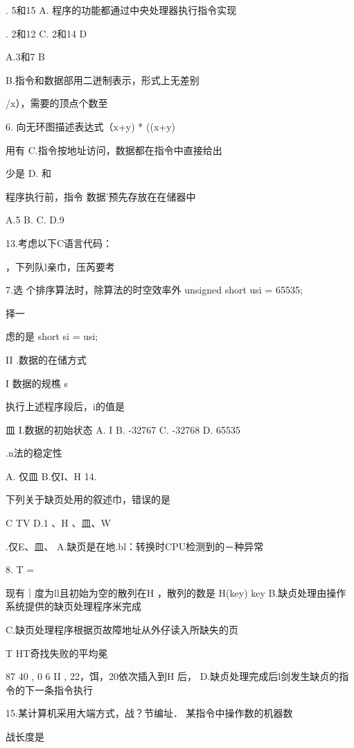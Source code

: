 {    . 5和15    A. 程序的功能都通过中央处理器执行指令实现

    . 2和12    C. 2和14    D

  A.3和7    B

    B.指令和数据部用二迸制表示，形式上无差别

    /x），需要的顶点个数至

6.    向无环图描述表达式（x+y) * ((x+y)

   用有    C.指令按地址访问，数据都在指令中直接给出

  少是    D.    和

    程序执行前，指令   数据'预先存放在在储器中

   A.5    B.      C.      D.9

    13.考虑以下C语言代码：

    ，下列队l亲巾，压芮要考

7.选   个排序算法时，除算法的时空效率外    unsigned short usi = 65535;

    择一

  虑的是    short si = usi;

    II .数据的在储方式

   I 数据的规樵    s

    执行上述程序段后，i的值是

   皿    I.数据的初始状态    A. I     B. -32767    C. -32768    D. 65535

    .n法的稳定性

   A. 仅皿    B.仅I、H    14.

    下列关于缺页处用的叙述巾，错误的是

  C    TV    D.1 、H 、皿、W

    .仅E、皿、    A.缺页是在地.bl：转换时CPU检测到的－种异常

8.    T    =

   现有｜度为ll且初始为空的散列在H ，散列的数是 H(key)  key    B.缺贞处理由操作系统提供的缺页处理程序米完成


    C.缺页处理程序根据页故障地址从外仔读入所缺失的页

    T    HT奇找失败的平均冕

   87  40 , 0  6  II , 22，饵，20依次插入到H 后，    D.缺贞处理完成后l剑发生缺贞的指令的下一条指令执行

    15.某计算机采用大端方式，战？节编址． 某指令中操作数的机器数

   战长度是

}
